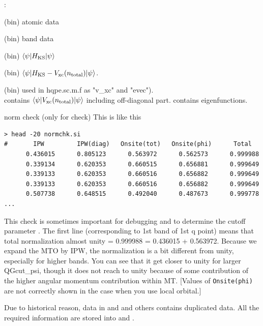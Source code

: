 :

\outfiles

(bin) atomic data
                     
(bin) band data

(bin) $\langle \psi|H_{\rm KS}|\psi \rangle$ 

(bin) $\langle \psi|H_{\rm KS}-V_{\rm xc}(n_{\rm total})|\psi \rangle$.

(bin) used in hqpe.sc.m.f as "v\_xc" and "evec").\\
 contains 
$\langle \psi|V_{\rm xc}(n_{\rm total})|\psi \rangle$ including off-diagonal part.
 contains eigenfunctions.

 norm check (only for check)
This is like this
{\baselineskip=2.8mm 
\begin{verbatim}
> head -20 normchk.si
#       IPW         IPW(diag)   Onsite(tot)   Onsite(phi)      Total
      0.436015      0.805123      0.563972      0.562573      0.999988
      0.339134      0.620353      0.660515      0.656881      0.999649
      0.339133      0.620353      0.660516      0.656882      0.999649
      0.339133      0.620353      0.660516      0.656882      0.999649
      0.507738      0.648515      0.492040      0.487673      0.999778
...
\end{verbatim}}
This check is sometimes important for debugging and to determine the cutoff parameter .
The first line (corresponding to 1st band of 1st q point)
means that total normalization almost unity
= 0.999988 = 0.436015 + 0.563972. Because we expand the MTO by IPW, 
the normalization is a bit different from unity, 
especially for higher bands.
You can see that it get closer to unity for larger QGcut\_psi, 
though it does not reach to unity because of some contribution 
of the higher angular momentum contribution within MT.
[Values of \verb#Onsite(phi)# are not correctly shown in the case when you use local orbital.]


Due to historical reason, data in  and 
and others contains duplicated data.
 All the required information are stored into  and .

\infiles




